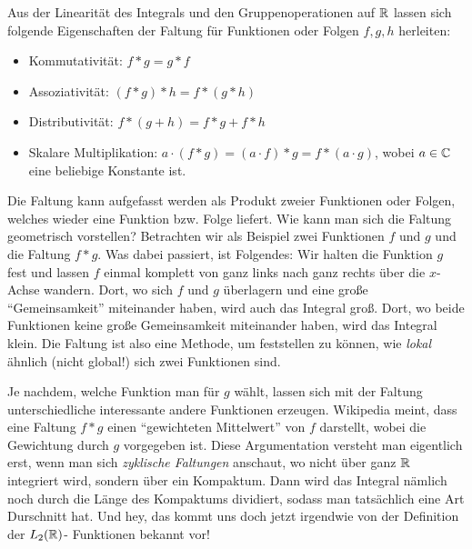\begin{remark}
Aus der Linearität des Integrals und den Gruppenoperationen auf $ \mathbb{R} $ lassen sich folgende 
Eigenschaften der Faltung für Funktionen oder Folgen $ f, g, h $ herleiten:
\begin{itemize}
\item Kommutativität: $ f * g = g * f $
\item Assoziativität: $ (f * g) * h = f * (g * h) $
\item Distributivität: $ f * (g + h) = f * g + f * h $
\item Skalare Multiplikation: $ a \cdot (f * g) = (a \cdot f) * g = f * (a \cdot g) $, wobei
  $ a \in \mathbb{C} $ eine beliebige Konstante ist.
\end{itemize}
\end{remark}
\begin{remark}
Die Faltung kann aufgefasst werden als Produkt zweier Funktionen oder Folgen, welches wieder eine
Funktion bzw. Folge liefert. Wie kann man sich die Faltung geometrisch vorstellen? Betrachten wir 
als Beispiel zwei Funktionen $ f $ und $ g $ und die Faltung $ f * g $. Was dabei passiert, ist 
Folgendes: Wir halten die Funktion $ g $ fest und lassen $ f $ einmal komplett von ganz links nach 
ganz rechts über die $ x $-Achse wandern. Dort, wo sich $ f $ und $ g $ überlagern und eine große 
\enquote{Gemeinsamkeit} miteinander haben, wird auch das Integral groß. Dort, wo beide Funktionen 
keine große Gemeinsamkeit miteinander haben, wird das Integral klein. Die Faltung ist also eine 
Methode, um feststellen zu können, wie \emph{lokal} ähnlich (nicht global!) sich zwei Funktionen 
sind.

Je nachdem, welche Funktion man für $ g $ wählt, lassen sich mit der Faltung unterschiedliche 
interessante andere Funktionen erzeugen. Wikipedia meint, dass eine Faltung $ f * g $ einen
\enquote{gewichteten Mittelwert} von $ f $ darstellt, wobei die Gewichtung durch $ g $ vorgegeben 
ist. Diese Argumentation versteht man eigentlich erst, wenn man sich \emph{zyklische Faltungen}
anschaut, wo nicht über ganz $ \mathbb{R} $ integriert wird, sondern über ein Kompaktum. Dann wird das
Integral nämlich noch durch die Länge des Kompaktums dividiert, sodass man tatsächlich eine Art
Durschnitt hat. Und hey, das kommt uns doch jetzt irgendwie von der Definition der $ L_{2}(\mathbb{R}) $-
Funktionen bekannt vor!
\end{remark}

